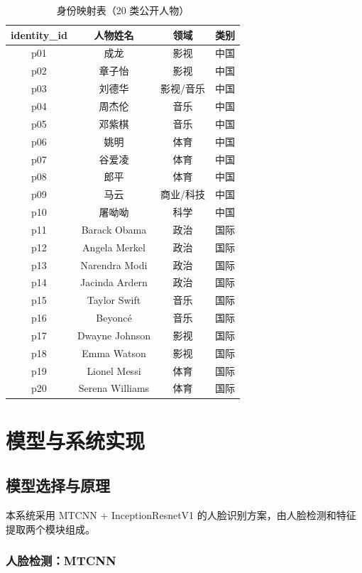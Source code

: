 \documentclass[12pt, a4paper]{article}
\begin{document}
\begin{table}[H]
\centering
\caption{身份映射表（20 类公开人物）}
\label{tab:identities}
\begin{tabular}{cccc}
\toprule
identity\_id & 人物姓名 & 领域 & 类别 \\
\midrule
p01 & 成龙 & 影视 & 中国 \\
p02 & 章子怡 & 影视 & 中国 \\
p03 & 刘德华 & 影视/音乐 & 中国 \\
p04 & 周杰伦 & 音乐 & 中国 \\
p05 & 邓紫棋 & 音乐 & 中国 \\
p06 & 姚明 & 体育 & 中国 \\
p07 & 谷爱凌 & 体育 & 中国 \\
p08 & 郎平 & 体育 & 中国 \\
p09 & 马云 & 商业/科技 & 中国 \\
p10 & 屠呦呦 & 科学 & 中国 \\
p11 & Barack Obama & 政治 & 国际 \\
p12 & Angela Merkel & 政治 & 国际 \\
p13 & Narendra Modi & 政治 & 国际 \\
p14 & Jacinda Ardern & 政治 & 国际 \\
p15 & Taylor Swift & 音乐 & 国际 \\
p16 & Beyoncé & 音乐 & 国际 \\
p17 & Dwayne Johnson & 影视 & 国际 \\
p18 & Emma Watson & 影视 & 国际 \\
p19 & Lionel Messi & 体育 & 国际 \\
p20 & Serena Williams & 体育 & 国际 \\
\bottomrule
\end{tabular}
\end{table}


\section{模型与系统实现}

\subsection{模型选择与原理}

本系统采用 MTCNN + InceptionResnetV1 的人脸识别方案，由人脸检测和特征提取两个模块组成。

\subsubsection{人脸检测：MTCNN}
\end{document}
